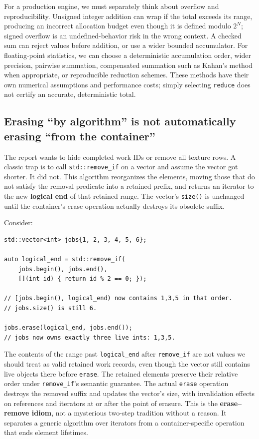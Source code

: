 For a production engine, we must separately think about overflow and reproducibility. Unsigned integer addition can wrap if the total exceeds its range, producing an incorrect allocation budget even though it is defined modulo \(2^N\); signed overflow is an undefined-behavior risk in the wrong context. A checked sum can reject values before addition, or use a wider bounded accumulator. For floating-point statistics, we can choose a deterministic accumulation order, wider precision, pairwise summation, compensated summation such as Kahan's method when appropriate, or reproducible reduction schemes. These methods have their own numerical assumptions and performance costs; simply selecting \texttt{reduce} does not certify an accurate, deterministic total.

\subsection{Erasing ``by algorithm'' is not automatically erasing ``from the container''}\label{01-foundations-i-ch006-erasing-by-algorithm-is-not-automatically-erasing-from-the-container}

The report wants to hide completed work IDs or remove all texture rows. A classic trap is to call \texttt{std::remove\_if} on a vector and assume the vector got shorter. It did not. This algorithm reorganizes the elements, moving those that do not satisfy the removal predicate into a retained prefix, and returns an iterator to the new \textbf{logical end} of that retained range. The vector's \texttt{size()} is unchanged until the container's erase operation actually destroys its obsolete suffix.

Consider:

\begin{verbatim}
std::vector<int> jobs{1, 2, 3, 4, 5, 6};

auto logical_end = std::remove_if(
    jobs.begin(), jobs.end(),
    [](int id) { return id % 2 == 0; });

// [jobs.begin(), logical_end) now contains 1,3,5 in that order.
// jobs.size() is still 6.

jobs.erase(logical_end, jobs.end());
// jobs now owns exactly three live ints: 1,3,5.
\end{verbatim}

The contents of the range past \texttt{logical\_end} after \texttt{remove\_if} are not values we should treat as valid retained work records, even though the vector still contains live objects there before \texttt{erase}. The retained elements preserve their relative order under \texttt{remove\_if}'s semantic guarantee. The actual \texttt{erase} operation destroys the removed suffix and updates the vector's size, with invalidation effects on references and iterators at or after the point of erasure. This is the \textbf{erase--remove idiom}, not a mysterious two-step tradition without a reason. It separates a generic algorithm over iterators from a container-specific operation that ends element lifetimes.


